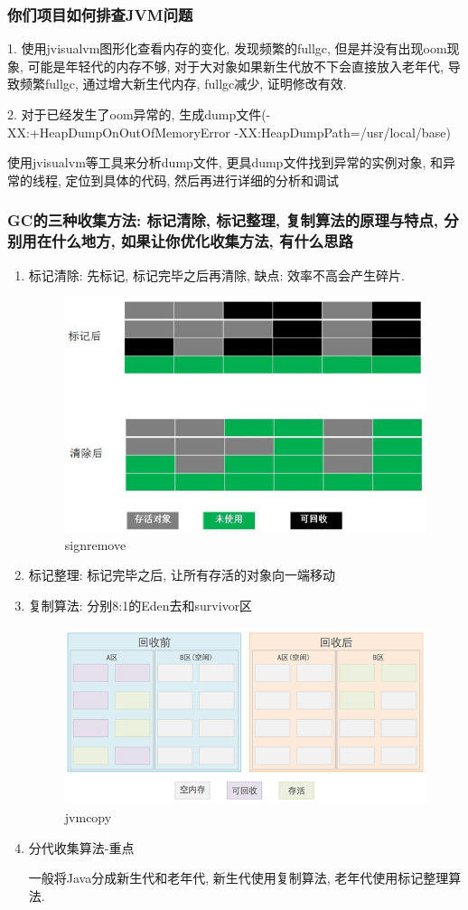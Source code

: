 \documentclass[UTF8]{ctexart}
\begin{document}
\subsubsection{你们项目如何排查JVM问题}
1. 使用jvisualvm图形化查看内存的变化, 发现频繁的fullgc, 但是并没有出现oom现象, 可能是年轻代的内存不够, 对于大对象如果新生代放不下会直接放入老年代, 导致频繁fullgc, 通过增大新生代内存, fullgc减少, 证明修改有效. \par
2. 对于已经发生了oom异常的, 生成dump文件(-XX:+HeapDumpOnOutOfMemoryError -XX:HeapDumpPath=/usr/local/base) \par
使用jvisualvm等工具来分析dump文件, 更具dump文件找到异常的实例对象, 和异常的线程, 定位到具体的代码, 然后再进行详细的分析和调试 \par
\subsubsection{GC的三种收集方法: 标记清除, 标记整理, 复制算法的原理与特点, 分别用在什么地方, 如果让你优化收集方法, 有什么思路}
\begin{enumerate}
	\item 标记清除: 先标记, 标记完毕之后再清除, 缺点: 效率不高会产生碎片.
	\begin{figure}
		\centering
		\includegraphics[width=0.7\linewidth]{figures/sign_remove.png}
		\caption{signremove}
		\label{fig:sign_remove}
	\end{figure}
	\item 标记整理: 标记完毕之后, 让所有存活的对象向一端移动
	\item 复制算法: 分别8:1的Eden去和survivor区
	\begin{figure}
		\centering
		\includegraphics[width=0.7\linewidth]{figures/jvm_copy.jpg}
		\caption{jvmcopy}
		\label{fig:jvm_copy}
	\end{figure}
	\item 分代收集算法-重点 \par
	一般将Java分成新生代和老年代, 新生代使用复制算法, 老年代使用标记整理算法.
\end{enumerate}
\end{document}
